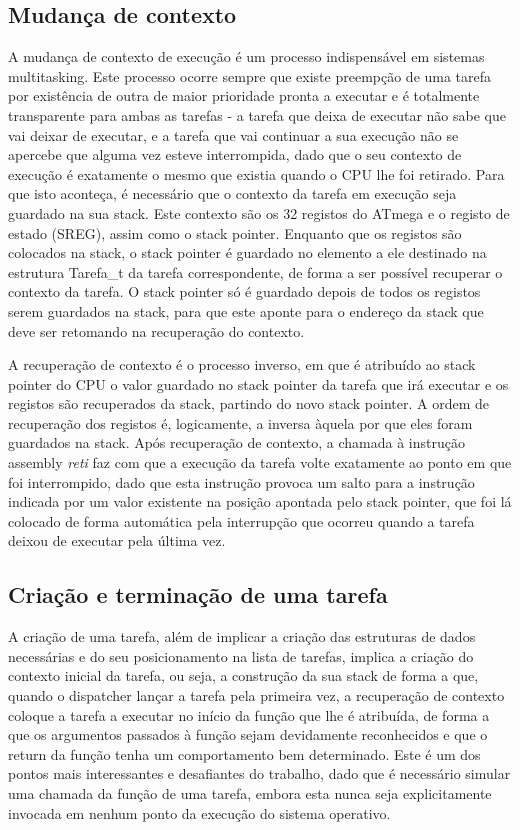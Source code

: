 \documentclass[journal]{IEEEtran}
\begin{document}
\subsection{Mudança de contexto}
A mudança de contexto de execução é um processo indispensável em sistemas multitasking.
Este processo ocorre sempre que existe preempção de uma tarefa por existência de outra de maior prioridade pronta a executar e é totalmente transparente para ambas as
tarefas - a tarefa que deixa de executar não sabe que vai deixar de executar, e a tarefa que vai continuar a sua execução não se apercebe que alguma vez esteve
interrompida, dado que o seu contexto de execução é exatamente o mesmo que existia quando o CPU lhe foi retirado.
Para que isto aconteça, é necessário que o contexto da tarefa em execução seja guardado na sua stack.
Este contexto são os 32 registos do ATmega e o registo de estado (SREG), assim como o stack pointer.
Enquanto que os registos são colocados na stack, o stack pointer é guardado no elemento a ele destinado na estrutura Tarefa\_t da tarefa correspondente, de forma a ser
possível recuperar o contexto da tarefa.
O stack pointer só é guardado depois de todos os registos serem guardados na stack, para que este aponte para o endereço da stack que deve ser retomando na recuperação do
contexto.

A recuperação de contexto é o processo inverso, em que é atribuído ao stack pointer do CPU o valor guardado no stack pointer da tarefa que irá executar e os registos são
recuperados da stack, partindo do novo stack pointer.
A ordem de recuperação dos registos é, logicamente, a inversa àquela por que eles foram guardados na stack.
Após recuperação de contexto, a chamada à instrução assembly \emph{reti} faz com que a execução da tarefa volte exatamente ao ponto em que foi interrompido, dado que esta
instrução provoca um salto para a instrução indicada por um valor existente na posição apontada pelo stack pointer, que foi lá colocado de forma automática pela
interrupção que ocorreu quando a tarefa deixou de executar pela última vez.

\subsection{Criação e terminação de uma tarefa}
A criação de uma tarefa, além de implicar a criação das estruturas de dados necessárias e do seu posicionamento na lista de tarefas, implica a criação do contexto inicial
da tarefa, ou seja, a construção da sua stack de forma a que, quando o dispatcher lançar a tarefa pela primeira vez, a recuperação de contexto coloque a tarefa a executar
no início da função que lhe é atribuída, de forma a que os argumentos passados à função sejam devidamente reconhecidos e que o return da função tenha um comportamento bem
determinado.
Este é um dos pontos mais interessantes e desafiantes do trabalho, dado que é necessário simular uma chamada da função de uma tarefa, embora esta nunca seja
explicitamente invocada em nenhum ponto da execução do sistema operativo.
\end{document}
